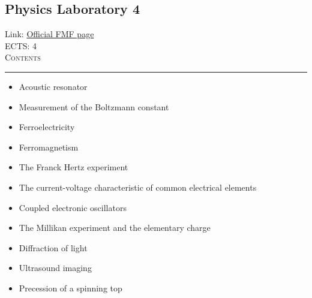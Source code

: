 \documentclass[11pt, a4paper]{article}
\newenvironment{course}[3]{
\subsection{#1}%
Link: \href{#2}{Official FMF page}\\%
ECTS: #3%
\vspace{1ex}
\\
{\large \textsc{Contents}}\\[-0.9ex]%
\rule{\textwidth}{0.5pt}
\vspace{-3ex}
}
{}
\newenvironment{chapter}[1]{
\begin{tcolorbox}[title=#1, breakable]
}
{\end{tcolorbox}}
\begin{document}
\begin{course}{Physics Laboratory 4}{https://www.fmf.uni-lj.si/en/study-physics/programmes/1fiz/2020/7000777/courses/1145/}{4}
    \label{physics-laboratory-4}

    \begin{chapter}{Experiments}
        \begin{itemize}
            
            \item Acoustic resonator

            \item Measurement of the Boltzmann constant

            \item Ferroelectricity

            \item Ferromagnetism

            \item The Franck Hertz experiment

            \item The current-voltage characteristic of common electrical elements

            \item Coupled electronic oscillators

            \item The Millikan experiment and the elementary charge

            \item Diffraction of light

            \item Ultrasound imaging

            \item Precession of a spinning top
            
        \end{itemize}
    \end{chapter}
\end{course}
\end{document}
